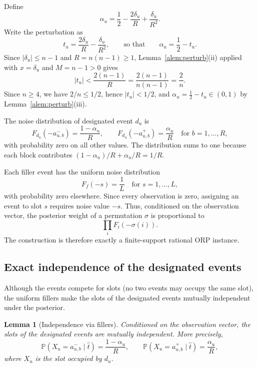\documentclass[11pt]{article}
\newtheorem{lemma}{Lemma}
\newcommand{\Prb}{\mathbb{P}}
\begin{document}
Define
\begin{equation}
  \alpha_u=\frac12-\frac{2\delta_u}{R}+\frac{\delta_u}{R^2}.
\end{equation}
Write the perturbation as
\begin{equation}
  t_u=\frac{2\delta_u}{R}-\frac{\delta_u}{R^2},
  \qquad\text{so that}\qquad
  \alpha_u=\frac12-t_u .
\end{equation}
Since $|\delta_u|\le n-1$ and $R=n(n-1)\ge 1$, Lemma~\ref{alem:perturb}(ii) applied with $x=\delta_u$ and $M=n-1>0$ gives
\begin{equation}
  |t_u|<\frac{2(n-1)}{R}=\frac{2(n-1)}{n(n-1)}=\frac2n .
\end{equation}
Since $n\ge 4$, we have $2/n\le 1/2$, hence $|t_u|<1/2$, and $\alpha_u=\tfrac12-t_u\in(0,1)$ by Lemma~\ref{alem:perturb}(iii).

The noise distribution of designated event $d_u$ is
\begin{equation}
  F_{d_u}(-a_{u,b}^-)=\frac{1-\alpha_u}{R},
  \qquad
  F_{d_u}(-a_{u,b}^+)=\frac{\alpha_u}{R}
  \quad\text{for }b=1,\ldots,R,
\end{equation}
with probability zero on all other values.  The distribution sums to one because each block contributes $(1-\alpha_u)/R+\alpha_u/R=1/R$.

Each filler event has the uniform noise distribution
\begin{equation}
  F_f(-s)=\frac1L\quad\text{for }s=1,
\ldots,L,
\end{equation}
with probability zero elsewhere.  Since every observation is zero, assigning an event to slot $s$ requires noise value $-s$.  Thus, conditioned on the observation vector, the posterior weight of a permutation $\sigma$ is proportional to
\begin{equation}
  \prod_i F_i(-\sigma(i)).
\end{equation}
The construction is therefore exactly a finite-support rational ORP instance.

\subsection{Exact independence of the designated events}

Although the events compete for slots (no two events may occupy the same slot), the uniform fillers make the slots of the designated events mutually independent under the posterior.

\begin{lemma}[Independence via fillers]\label{lem:independence}
Conditioned on the observation vector, the slots of the designated events are mutually independent.  More precisely,
\begin{equation}
  \Prb(X_u=a_{u,b}^-\mid \hat t)=\frac{1-\alpha_u}{R},
  \qquad
  \Prb(X_u=a_{u,b}^+\mid \hat t)=\frac{\alpha_u}{R},
\end{equation}
where $X_u$ is the slot occupied by $d_u$.
\end{lemma}
\end{document}
